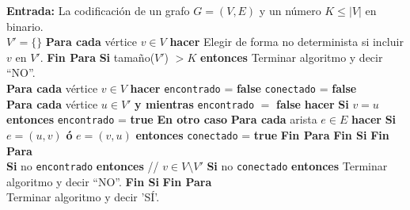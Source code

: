 \documentclass[12pt]{article}
\begin{document}
    \begin{algorithm}
        \caption{}\label{alg}
        \begin{algorithmic}
            \STATE \textbf{Entrada:} La codificación de un grafo $G=(V,E)$ y un número $K\leq |V|$ en binario.\\

            \noindent
            \STATE $V' = \{\}$
        \STATE \textbf{Para cada} vértice $v\in V$ \textbf{hacer}
            \STATE \quad Elegir de forma no determinista si incluir $v$ en $V'$.
            \STATE \textbf{Fin Para}
            \STATE \textbf{Si} tamaño($V'$) $> K$ \textbf{entonces }Terminar algoritmo y decir ``NO''.\\

            \noindent
            \STATE \textbf{Para cada} vértice $v\in V$ \textbf{hacer}
            \STATE \quad \texttt{encontrado} = \textbf{false}
            \STATE \quad \texttt{conectado} = \textbf{false}\\

            \noindent
            \STATE \quad \textbf{Para cada} vértice $u\in V'$ \textbf{y mientras} \texttt{encontrado} $=$ \textbf{false} \textbf{hacer}
            \STATE \quad \quad \textbf{Si} $v = u$ \textbf{entonces} \texttt{encontrado} = \textbf{true}
            \STATE \quad \quad \textbf{En otro caso} 
            \STATE \quad \quad \quad \textbf{Para cada} arista $e\in E$ \textbf{hacer}
            \STATE \quad \quad \quad \quad \textbf{Si} $e = (u, v)$ \textbf{ó} $e = (v, u)$ \textbf{entonces} \texttt{conectado} = \textbf{true}
            \STATE \quad \quad \quad \textbf{Fin Para}
            \STATE \quad \quad \textbf{Fin Si}
            \STATE \quad \textbf{Fin Para}\\

            \noindent
            \STATE \quad \textbf{Si} no \texttt{encontrado} \textbf{entonces} \quad //  $v \in V\setminus V'$
            \STATE \quad \quad \textbf{Si} no \texttt{conectado} \textbf{entonces} Terminar algoritmo y decir ``NO''.
            \STATE \quad \textbf{Fin Si}
            \STATE \textbf{Fin Para}\\

            \noindent
            \STATE Terminar algoritmo y decir 'SÍ'.
        \end{algorithmic}
    \end{algorithm}
    \newpage 
\end{document}
